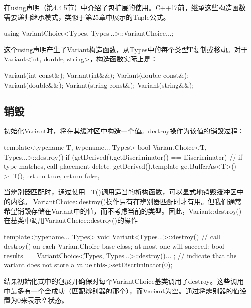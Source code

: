 \begin{notice}
在using声明（第4.4.5节）中介绍了包扩展的使用。C++17前，继承这些构造函数需要递归继承模式，类似于第25章中展示的Tuple公式。
\end{notice}

\begin{cpp}
using VariantChoice<Types, Types...>::VariantChoice...;
\end{cpp}

这个using声明产生了Variant构造函数，从Types中的每个类型T复制或移动。对于Variant<int, double, string>，构造函数实际上是：

\begin{cpp}
Variant(int const&);
Variant(int&&);
Variant(double const&);
Variant(double&&);
Variant(string const&);
Variant(string&&);
\end{cpp}

\subsection{销毁}

初始化Variant时，将在其缓冲区中构造一个值。destroy操作为该值的销毁过程：

\begin{cpp}
template<typename T, typename... Types>
bool VariantChoice<T, Types...>::destroy() {
	if (getDerived().getDiscriminator() == Discriminator) {
		// if type matches, call placement delete:
		getDerived().template getBufferAs<T>()->~T();
		return true;
	}
	return false;
}
\end{cpp}

当辨别器匹配时，通过使用 \inlcpp{->}~T()调用适当的析构函数，可以显式地销毁缓冲区中的内容。 
VariantChoice::destroy()操作只有在辨别器匹配时才有用。但我们通常希望销毁存储在Variant中的值，而不考虑当前的类型。因此，Variant::destroy()在基类中调用VariantChoice::destroy()的操作：

\begin{cpp}
template<typename... Types>
void Variant<Types...>::destroy() {
	// call destroy() on each VariantChoice base class; at most one will succeed:
	bool results[] = {
		VariantChoice<Types, Types...>::destroy()...
	};
	// indicate that the variant does not store a value
	this->setDiscriminator(0);
}
\end{cpp}

结果初始化式中的包展开确保对每个VariantChoice基类调用了destroy。这些调用中最多有一个会成功（匹配辨别器的那个），而Variant为空。通过将辨别器的值设置为0来表示空状态。

